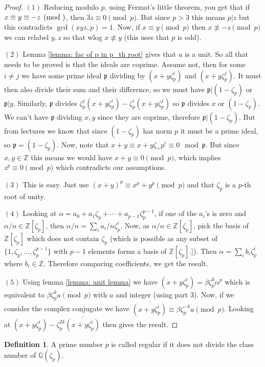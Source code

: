\documentclass[11pt,a4paper]{amsart}
\theoremstyle{plain}
\theoremstyle{definition}
\newtheorem{definition}[subsection]{Definition}
\theoremstyle{definition}
\newcommand{\ZZ}{\mathbb{Z}}
\def\QQ{\mathbb{Q}}
\def\gothp{\mathfrak{p}}
\def \a{\alpha}
\def \ov{\overline}
\begin{document}
	\begin{proof}
		
	
		$(1)$  Reducing modulo $p$, using Fermat's little theorem, you get that if $x \equiv y \equiv -z \pmod $, then $3z \equiv 0 \pmod p$. But since $p >3$ this means $p |z$ but this contradicts $\gcd(xyz,p)=1$. Now, if $x \equiv y \pmod p$ then  $x \not \equiv -z \pmod p$ we can relabel $y,z$ so that wlog $x \not \equiv y$ (this uses that $p$ is odd). 
			
			
			$(2)$  Lemma \ref{lemma: fac of p in p_th root} gives that $u$ is a unit. So all that needs to be proved is that the ideals are coprime. Assume not, then for some $i \neq j$ we have some prime ideal $\gothp$ dividing by $(x+y\zeta_p^i)$ and $(x+y\zeta_p^j)$. It must then also divide their sum and their difference, so we must have $\gothp | (1-\zeta_p)$ or $\gothp | y$. Similarly, $\gothp$ divides $\zeta_p^j(x+y\zeta_p^i)-\zeta_p^i(x+y\zeta_p^j)$ so $\gothp$ divides $x$ or $(1-\zeta_p)$. We can't have $\gothp$ dividing $x,y$ since they are coprime, therefore $\gothp |(1-\zeta_p)$. But from lectures we know that since $(1-\zeta_p)$ has norm $p$ it must be a prime ideal, so $\gothp=(1-\zeta_p)$. Now, note that $x+y \equiv x+y\zeta_+p^i \equiv 0 \mod \gothp$. But since $x,y \in \ZZ$ this means we would have $x+y \equiv 0 \pmod p$, which implies $z^p \equiv 0 \pmod p$ which contradicts our assumptions.
			
			$(3)$ This is easy. Just use $(x+y)^p \equiv x^p + y^p \pmod p$ and that $\zeta_p$ is a $p$-th root of unity.
			
			$(4)$  Looking at $\a=a_0+a_1\zeta_p+\cdots+a_{p-1}\zeta_p^{p-1}$, if one of the $a_i$'s is zero and $\a/n \in \ZZ[\zeta_p]$, then $\a/n=\sum_i a_i/n \zeta_p^i$. Now, as $\a/n \in \ZZ[\zeta_p]$, pick the basis of $\ZZ[\zeta_p]$ which does not contain $\zeta_p$ (which is possible as any subset of $\{1,\zeta_p,\dots,\zeta_p^{p-1}\}$ with $p-1$ elements forms a basis of $\ZZ[\zeta_p]$.]). Then $\a=\sum_i b_i \zeta_p^i$ where $b_i \in \ZZ$. Therefore comparing coefficients, we get the result.
			
			$(5)$  Using lemma \ref{lemma: unit lemma} we have $(x+y\zeta_p^i) =\beta \zeta_p^k \a^p$ which is equivalent to $\beta \zeta_p^k a \pmod p$ with $a$ and integer (using part $3$). Now, if we consider the complex conjugate we have $\ov{(x+y\zeta_p^i)  }\equiv \beta \zeta_p^{-k}a \pmod p$. Looking at $(x+y\zeta_p^i)-\zeta_p^{2k}\ov{(x+y\zeta_p^i)  }$ then gives the result.
			
			
			

		
	\end{proof}
	\begin{definition}\label{defn: is_regular_number}
		\leanok
		A prime number $p$ is called regular if it does not divide the class number of $\QQ(\zeta_p)$.
	\end{definition}
	
\end{document}
